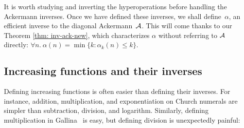 It is worth studying and inverting the hyperoperations before handling the Ackermann inverses.
Once we have defined these inverses, we shall define~$\alpha$, an efficient inverse to the diagonal Ackermann~$\mathcal{A}$. This will come thanks to our Theorem \ref{thm: inv-ack-new},
which characterizes $\alpha$ without referring to $\mathcal{A}$ directly:
$
\forall n.~ \alpha(n) = \min\big\{k : \alpha_k(n)\le k \big\}
$.





\subsection{Increasing functions and their inverses}
\label{sec:incfuncinv}
Defining increasing functions is often easier than defining their inverses.
For instance, addition, multiplication, and exponentiation on Church numerals
are simpler than subtraction, division, and logarithm. Similarly, defining multiplication in Gallina~\cite{coq} is easy, but defining division is unexpectedly painful:

